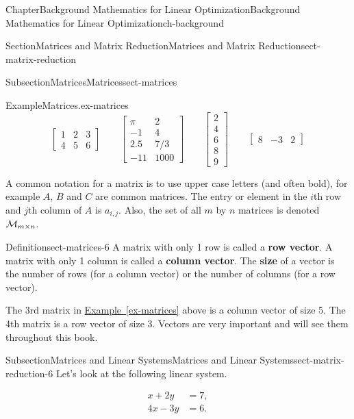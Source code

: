 \documentclass[oneside,10pt,]{book}
\newcommand{\xreffont}{\relax}
\newcommand{\terminology}[1]{\textbf{#1}}
\numberwithin{equation}{section}
\newcommand{\amp}{&}
\begin{document}
\begin{chapterptx}{Chapter}{Background Mathematics for Linear Optimization}{}{Background Mathematics for Linear Optimization}{}{}{ch-background}
\begin{sectionptx}{Section}{Matrices and Matrix Reduction}{}{Matrices and Matrix Reduction}{}{}{sect-matrix-reduction}
\begin{subsectionptx}{Subsection}{Matrices}{}{Matrices}{}{}{sect-matrices}
\begin{example}{Example}{Matrices.}{ex-matrices}
\begin{equation*}
\begin{bmatrix} 1 \amp 2 \amp 3 \\ 4 \amp 5 \amp 6 \end{bmatrix} \qquad \begin{bmatrix} \pi \amp 2 \\ -1 \amp 4 \\ 2.5 \amp 7/3 \\ -11 \amp 1000 \end{bmatrix} \qquad \begin{bmatrix} 2 \\ 4 \\ 6 \\ 8 \\ 9 \end{bmatrix} \qquad \begin{bmatrix} 8 \amp -3 \amp 2 \end{bmatrix}
\end{equation*}
%
\end{example}
A common notation for a matrix is to use upper case letters (and often bold), for example \(A\), \(B\) and \(C\) are common matrices. The entry or element in the \(i\)th row and \(j\)th column of \(A\) is \(a_{i,j}\). Also, the set of all \(m\) by \(n\) matrices is denoted \({\cal M}_{m \times n}\).%
\begin{definition}{Definition}{}{sect-matrices-6}%
A matrix with only 1 row is called a \terminology{row vector}. A matrix with only 1 column is called a \terminology{column vector}. The \terminology{size} of a vector is the number of rows (for a column vector) or the number of columns (for a row vector).%
\end{definition}
The 3rd matrix in \hyperref[ex-matrices]{Example~{\xreffont\ref{ex-matrices}}} above is a column vector of size 5. The 4th matrix is a row vector of size 3. Vectors are very important and will see them throughout this book.%
\end{subsectionptx}
%
%
\typeout{************************************************}
\typeout{************************************************}
%
\begin{subsectionptx}{Subsection}{Matrices and Linear Systems}{}{Matrices and Linear Systems}{}{}{sect-matrix-reduction-6}
Let's look at the following linear system.%
\par
%
\begin{align*}
x + 2y \amp = 7, \\
4x -3 y \amp = 6.
\end{align*}

\end{subsectionptx}
\end{sectionptx}
\end{chapterptx}
\end{document}
